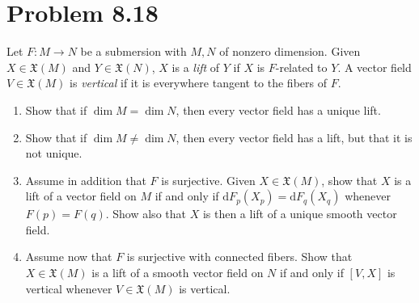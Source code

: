 \documentclass[11pt, letterpaper]{article}
\begin{document}
\section{Problem 8.18}
\begin{problem}
	Let $F : M \to N$ be a submersion with $M,N$ of nonzero dimension. Given $X\in \mathfrak{X} (M)$ and $Y\in \mathfrak{X} (N)$, $X$ is a \emph{lift} of $Y$ if $X$ is $F$-related to $Y$. A vector field $V\in \mathfrak{X} (M)$ is \emph{vertical} if it is everywhere tangent to the fibers of $F$.
	\begin{enumerate}
		\item Show that if $\dim M=\dim N$, then every vector field has a unique lift.
		\item Show that if $\dim M \neq \dim N$, then every vector field has a lift, but that it is not unique.
		\item Assume in addition that $F$ is surjective. Given $X\in \mathfrak{X} (M)$, show that $X$ is a lift of a vector field on $M$ if and only if $\mathrm{d} F_p(X_p)=\mathrm{d} F_q(X_q)$ whenever $F(p)=F(q)$. Show also that $X$ is then a lift of a unique smooth vector field.
		\item Assume now that $F$ is surjective with connected fibers. Show that $X\in \mathfrak{X} (M)$ is a lift of a smooth vector field on $N$ if and only if $[V,X]$ is vertical whenever $V\in \mathfrak{X} (M)$ is vertical.
	\end{enumerate}
\end{problem}
\end{document}
